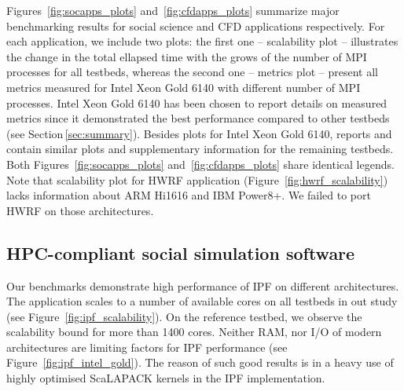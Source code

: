Figures~\ref{fig:socapps_plots} and~\ref{fig:cfdapps_plots} summarize major benchmarking results
for social science and CFD applications respectively.
For each application, we include two plots:
the first one -- scalability plot -- illustrates the change
in the total ellapsed time with the grows of the number of MPI processes for all testbeds,
whereas the second one -- metrics plot -- present all metrics measured for Intel Xeon Gold 6140 with different number of MPI processes.
Intel Xeon Gold 6140 has been  chosen to report details on measured metrics 
since it demonstrated the best performance compared to other testbeds (see Section\,\ref{sec:summary}).
Besides plots for Intel Xeon Gold 6140,
reports \cite{2017:coegss_benchmark1} and \cite{2018:coegss_benchmark2} contain similar plots and supplementary information for the remaining testbeds.
Both Figures~\ref{fig:socapps_plots} and~\ref{fig:cfdapps_plots} share identical legends.
Note that scalability plot for HWRF application (Figure~\ref{fig:hwrf_scalability}) lacks information about ARM Hi1616 and IBM Power8+.
We failed to port HWRF on those architectures.

\subsection{HPC-compliant social simulation software}


Our benchmarks demonstrate high performance of IPF on different  architectures.
The application scales to a number of available cores on all testbeds in out study (see Figure~\ref{fig:ipf_scalability}).
On the reference testbed, we observe the scalability bound for more than 1400 cores.
Neither  RAM, nor I/O of modern architectures are limiting factors for IPF performance (see Figure~\ref{fig:ipf_intel_gold}).
The reason of such good results is in a heavy use of highly optimised \textsf{ScaLAPACK} kernels in the IPF implementation.

